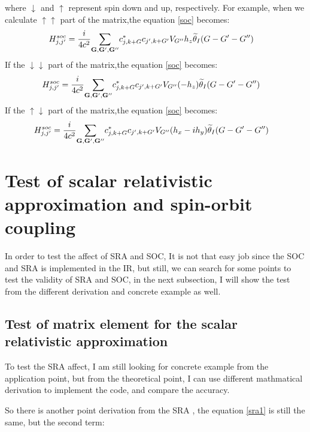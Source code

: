 \documentclass[a4paper]{report}
\begin{document}
\noindent where $\downarrow$ and $\uparrow$ represent spin down and up, respectively. 
\noindent For example, when we calculate $\uparrow \uparrow $ part of the matrix,the equation \ref{soc} becomes: 
\begin{equation}\label{soc2}
\begin{split}
& H_{j,j'}^{soc} = \frac{i}{4c^2}\sumg<G,G',G''> c_{j,k+G}^{*} c_{j',k+G'} V_{G''}  h_z  \widetilde{\theta}_{I}(G-G'-G'')  
\end{split}
\end{equation}
 If the $\downarrow \downarrow $ part of the matrix,the equation \ref{soc} becomes:
\begin{equation}
\begin{split}
& H_{j,j'}^{soc} = \frac{i}{4c^2}\sumg<G,G',G''> c_{j,k+G}^{*} c_{j',k+G'} V_{G''} (- h_z)  \widetilde{\theta}_{I}(G-G'-G'')  
\end{split}
\end{equation}
 If the $\uparrow \downarrow $ part of the matrix,the equation \ref{soc} becomes:
\begin{equation}\label{soc3}
\begin{split}
& H_{j,j'}^{soc} = \frac{i}{4c^2}\sumg<G,G',G''> c_{j,k+G}^{*} c_{j',k+G'} V_{G''} (h_x-i h_y)  \widetilde{\theta}_{I}(G-G'-G'')  
\end{split}
\end{equation}



\section{Test of scalar relativistic approximation and spin-orbit coupling}
In order to test the affect of SRA and SOC, It is not that easy job since the SOC and SRA is implemented in the IR, but still, we can search for some points to 
test the validity of SRA and SOC, in the next subsection, I will show the test from the different derivation and concrete example as well.

\subsection{Test of matrix element for the scalar relativistic approximation }
\noindent To test the SRA affect, I am still looking for concrete example from the application point, but from the theoretical point,
I can use different mathmatical derivation to implement the code, and compare the accuracy.

\noindent So there is another point derivation from the SRA \hm, the equation \ref{sra1} is still the same, but the second term:
\end{document}

